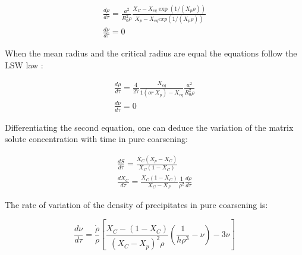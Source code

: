 \documentclass[12pt,a4paper]{article}
\begin{document}
\begin{subequations}
		\begin{align}
 \frac{d\rho}{d\tau} = \frac{a^2}{R_0^2 \rho}\frac{X_C -X_{eq}\exp(1/(X_p\rho))}{X_p - X_{eq}exp(1/(X_p\rho))}  \\
 \frac{d\nu}{d\tau} = 0 
 	\end{align} 
\end{subequations}

When the mean radius and the critical radius are equal the equations follow the LSW law :

\begin{subequations}
	\begin{align}
	\frac{d\rho}{d\tau} = \frac{4}{27}\frac{X_{eq}}{1 (or~X_p) - X_{eq}} \frac{a^2}{R_0^2 \rho} \\
	\frac{d\nu}{d\tau} = 0 
	\end{align} 
\end{subequations}

Differentiating the second equation, one can deduce the variation of the matrix solute concentration with time in pure coarsening:

\begin{subequations}
	\begin{align}
	\frac{dS}{d\tau} = \frac{\dot{X_C}(X_p - X_C)}{X_C(1-X_C)} \\
	\frac{dX_C}{d\tau} = \frac{X_C(1-X_C)}{X_C-X_P} \frac{1}{\rho^2} \frac{d\rho}{d\tau}
	\end{align} 
\end{subequations}

The rate of variation of the density of precipitates in pure coarsening is:

\begin{equation}
\frac{d\nu}{d\tau} = \frac{\dot{\rho}}{\rho} \left[  \frac{X_C-(1-X_C)}{(X_C - X_p)^2 \rho} \left( \frac{1}{h\rho^3} - \nu\right)  - 3\nu \right] 
\end{equation}

%
%
\end{document}
